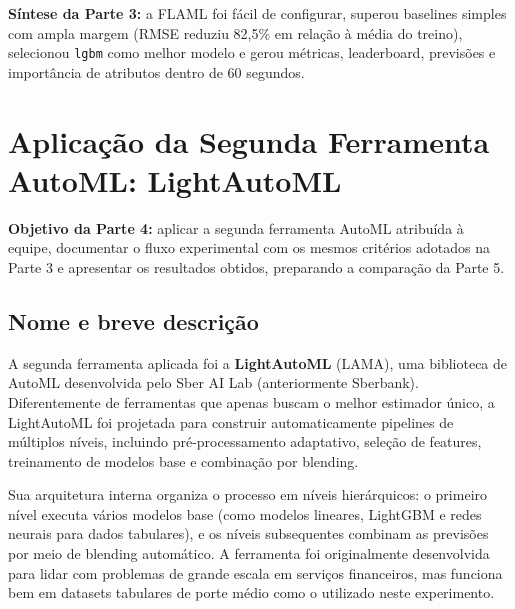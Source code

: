 \documentclass[11pt, a4paper, oneside]{article}
\begin{document}
\begin{notebox}
\textbf{Síntese da Parte 3:} a FLAML foi fácil de configurar, superou baselines simples
com ampla margem (RMSE reduziu 82,5\% em relação à média do treino), selecionou
\texttt{lgbm} como melhor modelo e gerou métricas, leaderboard, previsões e importância
de atributos dentro de 60 segundos.
\end{notebox}

\newpage

\section{Aplicação da Segunda Ferramenta AutoML: LightAutoML}
\label{sec:lightautoml}

\begin{infobox}
\textbf{Objetivo da Parte 4:} aplicar a segunda ferramenta AutoML atribuída à equipe,
documentar o fluxo experimental com os mesmos critérios adotados na Parte 3 e
apresentar os resultados obtidos, preparando a comparação da Parte 5.
\end{infobox}

\subsection{Nome e breve descrição}
\label{sec:lama-descricao}

A segunda ferramenta aplicada foi a \textbf{LightAutoML} (LAMA), uma biblioteca de
AutoML desenvolvida pelo Sber AI Lab (anteriormente Sberbank). Diferentemente de
ferramentas que apenas buscam o melhor estimador único, a LightAutoML foi projetada
para construir automaticamente pipelines de múltiplos níveis, incluindo pré-processamento
adaptativo, seleção de features, treinamento de modelos base e combinação por blending.

Sua arquitetura interna organiza o processo em níveis hierárquicos: o primeiro nível
executa vários modelos base (como modelos lineares, LightGBM e redes neurais para
dados tabulares), e os níveis subsequentes combinam as previsões por meio de blending
automático. A ferramenta foi originalmente desenvolvida para lidar com problemas de
grande escala em serviços financeiros, mas funciona bem em datasets tabulares de porte
médio como o utilizado neste experimento.
\end{document}
